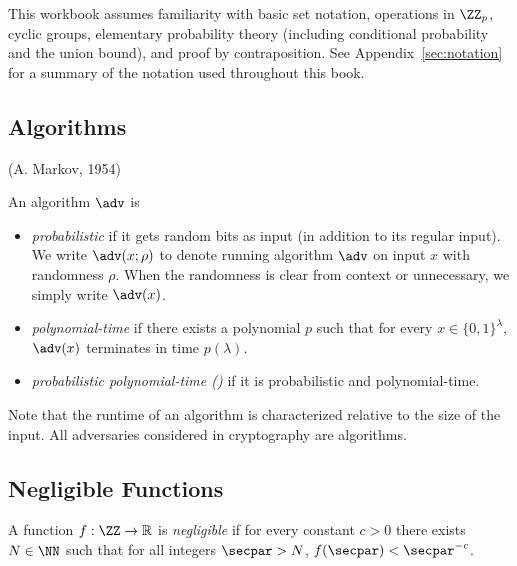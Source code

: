 This workbook assumes familiarity with basic set notation, operations in $\ZZ_p$, cyclic groups, elementary probability theory (including conditional probability and the union bound), and proof by contraposition.
See Appendix~\ref{sec:notation} for a summary of the notation used throughout this book.

\subsection{Algorithms}

 (A. Markov, 1954)

\begin{definition}
An algorithm $\adv$ is
\begin{itemize}
\item \emph{probabilistic} if it gets random bits as input (in addition to its regular input).
We write $\adv(x; \rho)$ to denote running algorithm $\adv$ on input $x$ with randomness $\rho$.
When the randomness is clear from context or unnecessary, we simply write $\adv(x)$.
\item \emph{polynomial-time} if there exists a polynomial $p$ such that for every $x \in \{0,1\}^\lambda$, $\adv(x)$ terminates in time $p(\lambda)$.
\item \emph{probabilistic polynomial-time (\ppt)} if it is probabilistic and polynomial-time.
\end{itemize}
\end{definition}

Note that the runtime of an algorithm is characterized relative to the size of the input.
All adversaries considered in cryptography are algorithms.

\subsection{Negligible Functions}



\begin{definition}
A function $f: \ZZ \rightarrow \mathbb{R}$ is \emph{negligible} if for every constant $c > 0$ there exists $N \in \NN$ such that for all integers $\secpar > N$, $f(\secpar) < \secpar^{-c}$.
\end{definition}


